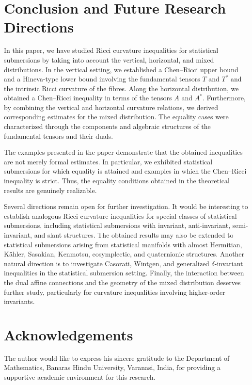 \documentclass[10pt,a4paper]{article}
\theoremstyle{definition}
\theoremstyle{remark}
\numberwithin{equation}{section}
\begin{document}
\section{Conclusion and Future Research Directions}

In this paper, we have studied Ricci curvature inequalities for statistical
submersions by taking into account the vertical, horizontal, and mixed
distributions. In the vertical setting, we established a Chen--Ricci upper
bound and a Hineva-type lower bound involving the fundamental tensors
$T$ and $T^{*}$ and the intrinsic Ricci curvature of the fibres. Along the
horizontal distribution, we obtained a Chen--Ricci inequality in terms of
the tensors $A$ and $A^{*}$. Furthermore, by combining the vertical and
horizontal curvature relations, we derived corresponding estimates for the
mixed distribution. The equality cases were characterized through the
components and algebraic structures of the fundamental tensors and their
duals.

The examples presented in the paper demonstrate that the obtained
inequalities are not merely formal estimates. In particular, we exhibited
statistical submersions for which equality is attained and examples in
which the Chen--Ricci inequality is strict. Thus, the equality conditions
obtained in the theoretical results are genuinely realizable.

Several directions remain open for further investigation. It would be
interesting to establish analogous Ricci curvature inequalities for
special classes of statistical submersions, including statistical
submersions with invariant, anti-invariant, semi-invariant, and slant
structures. The obtained results may also be extended to statistical
submersions arising from statistical manifolds with almost Hermitian,
K\"ahler, Sasakian, Kenmotsu, cosymplectic, and quaternionic structures.
Another natural direction is to investigate Casorati, Wintgen, and
generalized $\delta$-invariant inequalities in the statistical submersion
setting. Finally, the interaction between the dual affine connections and
the geometry of the mixed distribution deserves further study, particularly
for curvature inequalities involving higher-order invariants.

\section*{Acknowledgements}

The author would like to express his sincere gratitude to the Department
of Mathematics, Banaras Hindu University, Varanasi, India, for providing
a supportive academic environment for this research.
\end{document}
